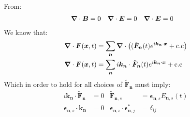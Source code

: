 From:
\begin{align*}
	\bm{\nabla}\cdot\bm{B} &= 0 &
	\bm{\nabla}\cdot\bm{E} &= 0 &
	\bm{\nabla}\cdot\bm{E} &= 0
\end{align*}
We know that:
\begin{align*}
	\bm{\nabla}\cdot\bm{F} (\bm{x},t) &= \sum_{\bm{n}} \bm{\nabla}\cdot\left((\tilde{\bm{F}}_{\bm{n}}(t) e^{i\bm{k}_{\bm{n}}\cdot\bm{x}} + \text{c.c}\right) \\
	\bm{\nabla}\cdot\bm{F} (\bm{x},t) &= \sum_{\bm{n}} i\bm{k}_{\bm{n}}\cdot\tilde{\bm{F}}_{\bm{n}}(t) e^{i\bm{k}_{\bm{n}}\cdot\bm{x}} + \text{c.c}
\end{align*}
Which in order to hold for all choices of $\tilde{\bm{F}}_{\bm{n}}$ must imply:
\begin{align*}
	i\bm{k}_{\bm{n}}\cdot\tilde{\bm{F}}_{\bm{n}} &= 0 &
	\tilde{\bm{F}}_{\bm{n},s} &= \bm{\epsilon}_{\bm{n},s} E_{\bm{n},s}(t) \\
	\bm{\epsilon}_{\bm{n},s} \cdot\bm{k}_{\bm{n}} &= 0 &
	\bm{\epsilon}_{\bm{n},i}\cdot\bm{\epsilon}_{\bm{n},j}^* &= \delta_{ij}
\end{align*}

